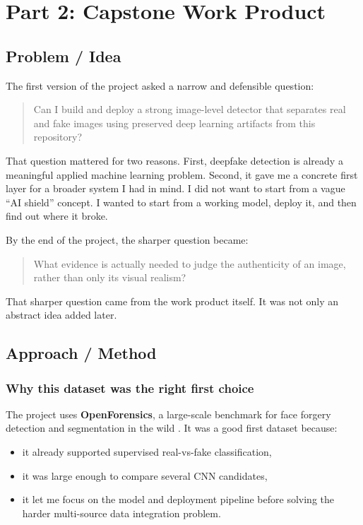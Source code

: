 \documentclass[11pt]{article}
\begin{document}
\clearpage
\tableofcontents
\clearpage

\section{Part 2: Capstone Work Product}

\subsection{Problem / Idea}
The first version of the project asked a narrow and defensible question:
\begin{quote}
Can I build and deploy a strong image-level detector that separates real and fake images using preserved deep learning artifacts from this repository?
\end{quote}

That question mattered for two reasons. First, deepfake detection is already a meaningful applied machine learning problem. Second, it gave me a concrete first layer for a broader system I had in mind. I did not want to start from a vague ``AI shield'' concept. I wanted to start from a working model, deploy it, and then find out where it broke.

By the end of the project, the sharper question became:
\begin{quote}
What evidence is actually needed to judge the authenticity of an image, rather than only its visual realism?
\end{quote}

That sharper question came from the work product itself. It was not only an abstract idea added later.

\subsection{Approach / Method}

\subsubsection{Why this dataset was the right first choice}
The project uses \textbf{OpenForensics}, a large-scale benchmark for face forgery detection and segmentation in the wild \cite{le2021openforensics}. It was a good first dataset because:
\begin{itemize}[leftmargin=1.5em]
    \item it already supported supervised real-vs-fake classification,
    \item it was large enough to compare several CNN candidates,
    \item it let me focus on the model and deployment pipeline before solving the harder multi-source data integration problem.
\end{itemize}
\end{document}
